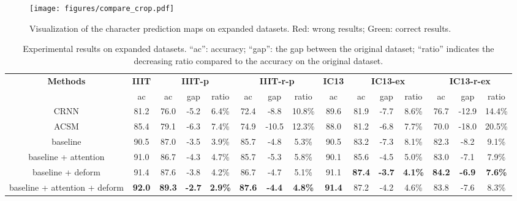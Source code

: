 \documentclass[letterpaper]{article} \usepackage{aaai19}  \usepackage{times}  \usepackage{helvet}  \usepackage{courier}  \usepackage{url}  \usepackage{graphicx}  \frenchspacing  \usepackage{multirow}
\begin{document}
\begin{figure*}[!ht]
\centering
\texttt{[image: figures/compare\_crop.pdf]}
\caption{Visualization of the character prediction maps on expanded datasets. Red: wrong results; Green: correct results.}
\label{fig:compare}
\end{figure*}

\begin{table*}[!ht]
\centering
\caption{Experimental results on expanded datasets. ``ac'': accuracy; ``gap'': the gap between the original dataset; ``ratio'' indicates the decreasing ratio compared to the accuracy on the original dataset.}
\label{tab:expand}
\scriptsize
\begin{tabular}{|c|c|c|c|c|c|c|c|c|c|c|c|c|c|c|}
\hline
\multirow{2}{*}{\textbf{Methods}} & \textbf{IIIT}          & \multicolumn{3}{c|}{\textbf{IIIT-p}}                    & \multicolumn{3}{c|}{\textbf{IIIT-r-p}}     & \textbf{IC13}          & \multicolumn{3}{c|}{\textbf{IC13-ex}}                   & \multicolumn{3}{c|}{\textbf{IC13-r-ex}}                 \\ \cline{2-15} 
                         & ac            & ac            & gap           & ratio          & ac        & gap       & ratio     & ac            & ac            & gap           & ratio          & ac            & gap           & ratio          \\ \hline
CRNN                    & 81.2          & 76.0              & -5.2              & 6.4\%               & 72.4          &  -8.8         & 10.8\%          & 89.6          & 81.9               & -7.7              & 8.6\%                &76.7               & -12.9              & 14.4\%               \\ \hline
ACSM                 & 85.4          & 79.1              & -6.3              & 7.4\%               & 74.9          &  -10.5         & 12.3\%          & 88.0         & 81.2              & -6.8             & 7.7\%                & 70.0              & -18.0              & 20.5\%               \\ \hline
baseline                  & 90.5 & 87.0 & -3.5 & 3.9\% & 85.7 & -4.8 & 5.3\% & 90.5 & 83.2 & -7.3 & 8.1\% & 82.3 & -8.2 & 9.1\% \\ \hline
baseline + attention                  & 91.0 & 86.7 & -4.3 & 4.7\% & 85.7 & -5.3 & 5.8\% & 90.1 & 85.6 & -4.5 & 5.0\% & 83.0 & -7.1 & 7.9\% \\ \hline
baseline + deform                  & 91.4 & 87.6 & -3.8 & 4.2\% & 86.7 & -4.7 & 5.1\% & 91.1 & \textbf{87.4} & \textbf{-3.7} & \textbf{4.1\%} & \textbf{84.2} & \textbf{-6.9} & \textbf{7.6\%} \\ \hline
baseline + attention + deform                  & \textbf{92.0} & \textbf{89.3} & \textbf{-2.7} & \textbf{2.9\%} & \textbf{87.6} & \textbf{-4.4} & \textbf{4.8\%} & \textbf{91.4} & 87.2 & -4.2 & 4.6\% & 83.8 & -7.6 & 8.3\% \\ \hline
\end{tabular}
\end{table*}
\end{document}
